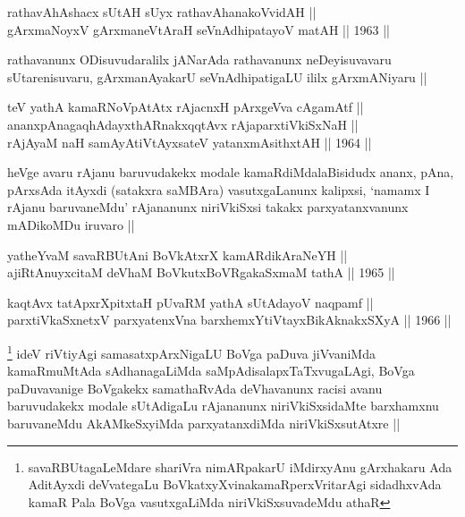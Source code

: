 
\begin{shl}
rathavAhAshacx sUtAH sUyx rathavAhanakoVvidAH || \\
gArxmaNoyxV gArxmaneVtAraH seVnAdhipatayoV matAH ||  1963 ||  
\end{shl}

\begin{artha}
rathavanunx ODisuvudaralilx jANarAda rathavanunx neDeyisuvavaru
sUtarenisuvaru, gArxmanAyakarU seVnAdhipatigaLU ililx gArxmANiyaru ||
\end{artha}

\begin{shl}
teV yathA kamaRNoVpAtAtx rAjacnxH pArxgeVva cA\s \s gamAtf || \\
ananxpAnagaqhAdayxthARnakxqqtAvx rAjaparxtiVkiSxNaH || \\
rAjA\s yaM naH samAyAtiVtAyxsateV yatanxmAsithxtAH ||  1964 || 
\end{shl} 

\begin{artha}
heVge avaru rAjanu baruvudakekx modale kamaRdiMdalaBisidudx ananx, pAna,
pArxsAda itAyxdi (satakxra saMBAra) vasutxgaLanunx kalipxsi, `namamx I
rAjanu baruvaneMdu' rAjananunx niriVkiSxsi takakx parxyatanxvanunx
mADikoMDu iruvaro ||
\end{artha}


\begin{shl}
yatheYvaM savaRBUtAni BoVkAtxrX kamARdikAraNeYH || \\
ajiRtAnuyxcitaM deVhaM BoVkutxBoVRgakaSxmaM tathA ||  1965 ||  
\end{shl}

\begin{shl}
kaqtAvx tatApxrXpitxtaH pUvaRM yathA sUtAdayoV naqpamf || \\
parxtiVkaSxnetxV parxyatenxVna barxhemxYtiVtayxBikAknakxSXyA ||  1966 ||  
\end{shl}

\begin{artha}
\footnote[1]{savaRBUtagaLeMdare shariVra nimARpakarU iMdirxyAnu
gArxhakaru Ada AditAyxdi deVvategaLu BoVkatxyXvinakamaRperxVritarAgi
sidadhxvAda kamaR Pala BoVga vasutxgaLiMda  niriVkiSxsuvadeMdu athaR}
ideV riVtiyAgi samasatxpArxNigaLU BoVga paDuva jiVvaniMda kamaRmuMtAda
sAdhanagaLiMda saMpAdisalapxTaTxvugaLAgi, BoVga paDuvavanige BoVgakekx
samathaRvAda deVhavanunx racisi avanu baruvudakekx modale sUtAdigaLu
rAjananunx niriVkiSxsidaMte barxhamxnu baruvaneMdu AkAMkeSxyiMda
parxyatanxdiMda niriVkiSxsutAtxre ||
\end{artha}

